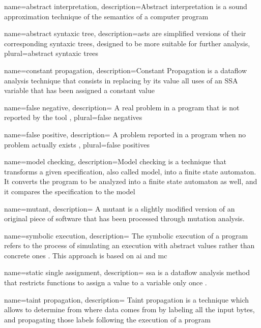 {
  name=abstract interpretation,
  description={Abstract interpretation is a sound approximation technique of the semantics of a computer program}
}

{
  name=abstract syntaxic tree,
  description={\Glspl{ast} are simplified versions of their corresponding syntaxic trees, designed to be more suitable for further analysis},
  plural=abstract syntaxic trees
}

{
  name=constant propagation,
  description={Constant Propagation is a dataflow analysis technique that consists in replacing by its value all uses of an SSA variable that has been assigned a constant value}
}

{
    name=false negative,
    description={
        A real problem in a program that is not reported by the tool \cite{chess2007secure}
    },
    plural=false negatives
}

{
    name=false positive,
    description={
        A problem reported in a program when no problem actually exists \cite{chess2007secure}
    },
    plural=false positives
}

{
    name=model checking,
    description={Model checking is a technique that transforms a given specification, also called model, into a finite state automaton. It converts the program to be analyzed into a finite state automaton as well, and it compares the specification to the model \cite{chess2007secure}}
}

{
    name=mutant,
    description={
        A mutant is a slightly modified version of an original piece of software that has been processed through mutation analysis.
    }
}

{
    name=symbolic execution,
    description={
        The symbolic execution of a program refers to the process of simulating an execution with abstract values rather than concrete ones \cite{anderson2008use}. This approach is based on \gls{ai} and \gls{mc}
    }
}

{
    name=static single assignment,
    description={
        \gls{ssa} is a dataflow analysis method that restricts functions to assign a value to a variable only once \cite{chess2007secure}.
    }
}

{
    name=taint propagation,
    description={
         Taint propagation is a technique which allows to determine from where data comes from by labeling all the input bytes, and propagating those labels following the execution of a program
    }
}

